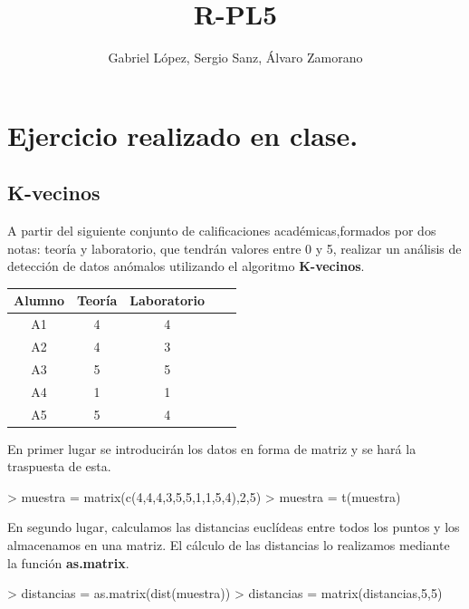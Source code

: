 \documentclass [a4paper] {article}
\title{R-PL5}
\author{Gabriel López, Sergio Sanz, Álvaro Zamorano}
\begin{document}


\maketitle

\graphicspath{ {./tmp/} }

\section{Ejercicio realizado en clase.}

\subsection{K-vecinos}
\bigskip
A partir del siguiente conjunto de calificaciones académicas,formados por dos notas: teoría y laboratorio, 
que tendrán valores entre 0 y 5, realizar un análisis de detección de datos anómalos utilizando el algoritmo
\textbf{K-vecinos}.

\begin{table}[H]
\begin{center}
\begin{tabular}{|c|c|c|c|c|}
\hline
Alumno & Teoría & Laboratorio\\
\hline \hline
A1 & 4 & 4 \\ \hline
A2 & 4 & 3 \\ \hline
A3 & 5 & 5 \\ \hline
A4 & 1 & 1 \\ \hline
A5 & 5 & 4 \\ \hline
\end{tabular}
\end{center}
\end{table}

En primer lugar se introducirán los datos en forma de matriz y se hará la traspuesta de esta.
\begin{Schunk}
\begin{Sinput}
> muestra = matrix(c(4,4,4,3,5,5,1,1,5,4),2,5)
> muestra = t(muestra)
\end{Sinput}
\end{Schunk}

\bigskip
En segundo lugar, calculamos las distancias euclídeas entre todos los puntos y los almacenamos 
en una matriz. El cálculo de las distancias lo realizamos mediante la función \textbf{as.matrix}. 

\bigskip
\begin{Schunk}
\begin{Sinput}
> distancias = as.matrix(dist(muestra))
> distancias = matrix(distancias,5,5)
\end{Sinput}
\end{Schunk}
\end{document}
